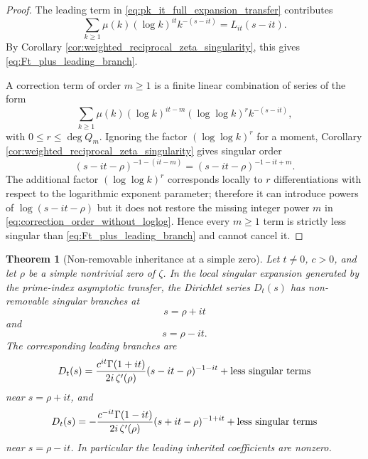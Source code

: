 \documentclass[11pt]{amsart}
\numberwithin{equation}{section}
\theoremstyle{plain}
\newtheorem{theorem}{Theorem}[section]
\theoremstyle{definition}
\theoremstyle{remark}
\begin{document}
\begin{proof}
The leading term in \eqref{eq:pk_it_full_expansion_transfer} contributes
\begin{equation}
\sum_{k\ge1}\mu(k)(\log k)^{it}k^{-(s-it)}
=L_{it}(s-it).
\label{eq:leading_term_as_Lit}
\end{equation}
By Corollary \ref{cor:weighted_reciprocal_zeta_singularity}, this gives
\eqref{eq:Ft_plus_leading_branch}.

A correction term of order $m\ge1$ is a finite linear combination of
series of the form
\begin{equation}
\sum_{k\ge1}\mu(k)
(\log k)^{it-m}(\log\log k)^r k^{-(s-it)},
\label{eq:correction_term_form}
\end{equation}
with $0\le r\le \deg Q_m$.  Ignoring the factor $(\log\log k)^r$ for a
moment, Corollary \ref{cor:weighted_reciprocal_zeta_singularity} gives
singular order
\begin{equation}
(s-it-\rho)^{-1-(it-m)}=(s-it-\rho)^{-1-it+m}.
\label{eq:correction_order_without_loglog}
\end{equation}
The additional factor $(\log\log k)^r$ corresponds locally to
$r$ differentiations with respect to the logarithmic exponent parameter;
therefore it can introduce powers of $\log(s-it-\rho)$ but it does not
restore the missing integer power $m$ in
\eqref{eq:correction_order_without_loglog}.  Hence every $m\ge1$ term is
strictly less singular than \eqref{eq:Ft_plus_leading_branch} and cannot
cancel it.
\end{proof}

\begin{theorem}[Non-removable inheritance at a simple zero]
\label{thm:nonremovable_inheritance_simple}
Let $t\ne0$, $c>0$, and let $\rho$ be a simple nontrivial zero of
$\zeta$.  In the local singular expansion generated by the prime-index
asymptotic transfer, the Dirichlet series $D_t(s)$ has non-removable
singular branches at
\begin{equation}
s=\rho+it
\label{eq:inheritance_theorem_plus_location}
\end{equation}
and
\begin{equation}
s=\rho-it.
\label{eq:inheritance_theorem_minus_location}
\end{equation}
The corresponding leading branches are
\begin{equation}
D_t(s)=
\frac{c^{it}\Gamma(1+it)}{2i\,\zeta'(\rho)}
(s-it-\rho)^{-1-it}
+\hbox{less singular terms}
\label{eq:Dt_plus_inherited_branch}
\end{equation}
near $s=\rho+it$, and
\begin{equation}
D_t(s)=
-\frac{c^{-it}\Gamma(1-it)}{2i\,\zeta'(\rho)}
(s+it-\rho)^{-1+it}
+\hbox{less singular terms}
\label{eq:Dt_minus_inherited_branch}
\end{equation}
near $s=\rho-it$.
In particular the leading inherited coefficients are nonzero.
\end{theorem}
\end{document}
